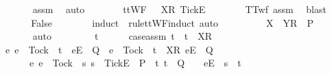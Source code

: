 \begin{isabellebody}
\ \ \ \ \ \ \isamarkupfalse%
\ assm{}\ \isamarkupfalse%
\ auto\isanewline
\ \ \ \ \isamarkupfalse%
\ \isamarkupfalse%
\ {\isachardoublequoteopen}ttWF\ {\isacharparenleft}{\isasymrho}\ {\isacharat}\ {\isacharbrackleft}{\isacharbrackleft}X{\isacharbrackright}\isactrlsub R{\isacharcomma}\ {\isacharbrackleft}Tick{\isacharbrackright}\isactrlsub E{\isacharbrackright}{\isacharparenright}{\isachardoublequoteclose}\isanewline
\ \ \ \ \ \ \isamarkupfalse%
\ TT{\isacharunderscore}wf\ assm{}\ \isamarkupfalse%
\ blast\isanewline
\ \ \ \ \isamarkupfalse%
\ \isamarkupfalse%
\ {\isachardoublequoteopen}False{\isachardoublequoteclose}\isanewline
\ \ \ \ \ \ \isamarkupfalse%
\ {\isacharparenleft}induct\ {\isasymrho}\ rule{\isacharcolon}ttWF{\isachardot}induct{\isacharcomma}\ auto{\isacharparenright}\isanewline
\ \ \ \ \isamarkupfalse%
\ \isamarkupfalse%
\ {\isachardoublequoteopen}{\isasymrho}\ {\isacharat}\ {\isacharbrackleft}{\isacharbrackleft}X\ {\isasymunion}\ Y{\isacharbrackright}\isactrlsub R{\isacharbrackright}\ {\isasymin}\ P{\isachardoublequoteclose}\isanewline
\ \ \ \ \ \ \isamarkupfalse%
\ auto\isanewline
\ \ \isamarkupfalse%
\isanewline
\ \ \ \ \isamarkupfalse%
\ t{\isacharprime}\isanewline
\ \ \ \ \isamarkupfalse%
\ case{\isacharunderscore}assm{\isacharcolon}\ {\isachardoublequoteopen}t\ {\isacharequal}\ t{\isacharprime}\ {\isacharat}\ {\isacharbrackleft}{\isacharbrackleft}X{\isacharbrackright}\isactrlsub R{\isacharbrackright}{\isachardoublequoteclose}\isanewline
\ \ \ \ \isamarkupfalse%
\ \isamarkupfalse%
\ {}{\isacharcolon}\ {\isachardoublequoteopen}{\isacharbraceleft}e{\isachardot}\ e\ {\isasymnoteq}\ Tock\ {\isasymand}\ t{\isacharprime}\ {\isacharat}\ {\isacharbrackleft}{\isacharbrackleft}e{\isacharbrackright}\isactrlsub E{\isacharbrackright}\ {\isasymin}\ Q\ {\isasymor}\ e\ {\isacharequal}\ Tock\ {\isasymand}\ t{\isacharprime}\ {\isacharat}\ {\isacharbrackleft}{\isacharbrackleft}X{\isacharbrackright}\isactrlsub R{\isacharcomma}\ {\isacharbrackleft}e{\isacharbrackright}\isactrlsub E{\isacharbrackright}\ {\isasymin}\ Q{\isacharbraceright}\isanewline
\ \ \ \ \ \ {\isasymsubseteq}\ {\isacharbraceleft}e{\isachardot}\ e\ {\isasymnoteq}\ Tock\ {\isasymand}\ {\isacharparenleft}{\isasymexists}s{\isachardot}\ s\ {\isacharat}\ {\isacharbrackleft}{\isacharbrackleft}Tick{\isacharbrackright}\isactrlsub E{\isacharbrackright}\ {\isasymin}\ P\ {\isasymand}\ {\isacharparenleft}{\isasymexists}t{\isachardot}\ t\ {\isasymin}\ Q\ {\isasymand}\ {\isasymrho}\ {\isacharat}\ {\isacharbrackleft}{\isacharbrackleft}e{\isacharbrackright}\isactrlsub E{\isacharbrackright}\ {\isacharequal}\ s\ {\isacharat}\ t{\isacharparenright}{\isacharparenright}\ {\isasymor}\isanewline

\end{isabellebody}
